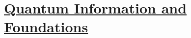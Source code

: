 \section[Quantum Information and Foundations]{\hyperlink{toc}{Quantum Information and Foundations}}
